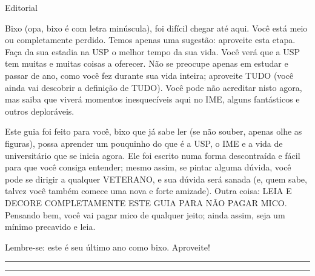 \begin{secao}{Editorial}

Bixo (opa, bixo é com letra minúscula), foi difícil chegar até aqui. Você está meio ou completamente perdido. Temos apenas uma sugestão: aproveite esta etapa. Faça da sua estadia na USP o melhor tempo da sua vida. Você verá que a USP tem muitas e muitas coisas a oferecer. Não se preocupe apenas em estudar e passar de ano, como você fez durante sua vida inteira; aproveite TUDO (você ainda vai descobrir a definição de TUDO). Você pode não acreditar nisto agora, mas saiba que viverá momentos inesquecíveis aqui no IME, alguns fantásticos e outros deploráveis. 

Este guia foi feito para você, bixo que já sabe ler (se não souber, apenas olhe as figuras), possa aprender um pouquinho do que é a USP, o IME e a vida de universitário que se inicia agora. Ele foi escrito numa forma descontraída e fácil para que você consiga entender; mesmo assim, se pintar alguma dúvida, você pode se dirigir a qualquer VETERANO, e sua dúvida será sanada (e, quem sabe, talvez você também comece uma nova e forte amizade). Outra coisa: LEIA E DECORE COMPLETAMENTE ESTE GUIA PARA NÃO PAGAR MICO. Pensando bem, você vai pagar mico de qualquer jeito; ainda assim, seja um mínimo precavido e leia.

Lembre-se: este é seu último ano como bixo. Aproveite!

\rule{\textwidth}{0.5ex}\rule{2ex}{0.5ex}


\end{secao}
